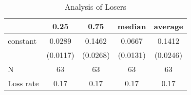 \begin{table}
\caption{Analysis of Losers}
\begin{center}
\begin{tabular}{lcccc}
\hline
          &   0.25   &   0.75   &  median  & average   \\
\midrule
\midrule
constant  & 0.0289   & 0.1462   & 0.0667   & 0.1412    \\
          & (0.0117) & (0.0268) & (0.0131) & (0.0246)  \\
N         & 63       & 63       & 63       & 63        \\
Loss rate & 0.17     & 0.17     & 0.17     & 0.17      \\
\hline
\end{tabular}
\end{center}
\end{table}